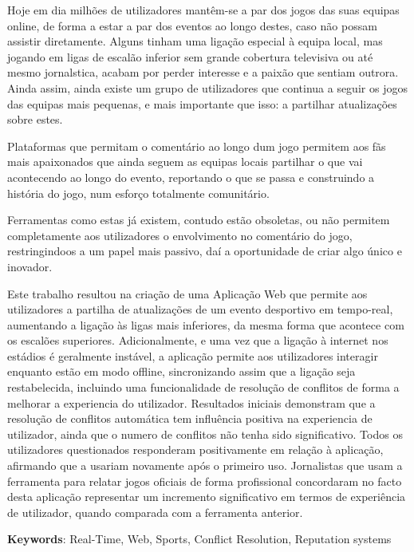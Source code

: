 Hoje em dia milhões de utilizadores mantêm-se a par dos jogos das suas equipas online, de forma a estar a par dos eventos ao longo destes, caso não possam assistir diretamente. Alguns tinham uma ligação especial à equipa local, mas jogando em ligas de escalão inferior sem grande cobertura televisiva ou até mesmo jornalstica, acabam por perder interesse e a paixão que sentiam outrora. Ainda assim, ainda existe um grupo de utilizadores que continua a seguir os jogos das equipas mais pequenas, e mais importante que isso: a partilhar atualizações sobre estes. 

Plataformas que permitam o comentário ao longo dum jogo permitem aos fãs mais apaixonados que ainda seguem as equipas locais partilhar o que vai acontecendo ao longo do evento, reportando o que se passa e construindo a história do jogo, num esforço totalmente comunitário. 

Ferramentas como estas já existem, contudo estão obsoletas, ou não permitem completamente aos utilizadores o envolvimento no comentário do jogo, restringindoos a um papel mais passivo, daí a oportunidade de criar algo único e inovador. 

Este trabalho resultou na criação de uma Aplicação Web que permite aos utilizadores a partilha de atualizações de um evento desportivo em tempo-real, aumentando a ligação às ligas mais inferiores, da mesma forma que acontece com os escalões superiores. Adicionalmente, e uma vez que a ligação à internet nos estádios é geralmente instável, a aplicação permite aos utilizadores interagir enquanto estão em modo offline, sincronizando assim que a ligação seja restabelecida, incluindo uma funcionalidade de resolução de conflitos de forma a melhorar a experiencia do utilizador. Resultados iniciais demonstram que a resolução de conflitos automática tem influência positiva na experiencia de utilizador, ainda que o numero de conflitos não tenha sido significativo. Todos os utilizadores questionados responderam positivamente em relação à aplicação, afirmando que a usariam novamente após o primeiro uso. Jornalistas que usam a ferramenta para relatar jogos oficiais de forma profissional concordaram no facto desta aplicação representar um incremento significativo em termos de experiência de utilizador, quando comparada com a ferramenta anterior. 


\vspace*{10mm}\noindent
\textbf{Keywords}: Real-Time, Web, Sports, Conflict Resolution, Reputation systems
